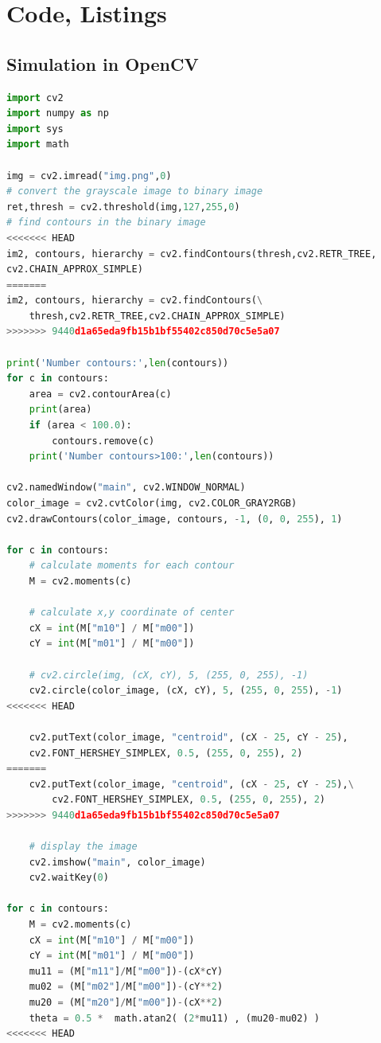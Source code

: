 \documentclass[a4paper]{report}
\begin{document}
\section{Code, Listings}

\subsection{Simulation in OpenCV}

\begin{lstlisting}[language=Python, caption=Simulation in OpenCV]      
import cv2
import numpy as np 
import sys
import math

img = cv2.imread("img.png",0)
# convert the grayscale image to binary image
ret,thresh = cv2.threshold(img,127,255,0)
# find contours in the binary image
<<<<<<< HEAD
im2, contours, hierarchy = cv2.findContours(thresh,cv2.RETR_TREE,
cv2.CHAIN_APPROX_SIMPLE)
=======
im2, contours, hierarchy = cv2.findContours(\
	thresh,cv2.RETR_TREE,cv2.CHAIN_APPROX_SIMPLE)
>>>>>>> 9440d1a65eda9fb15b1bf55402c850d70c5e5a07

print('Number contours:',len(contours))
for c in contours:
    area = cv2.contourArea(c)
    print(area)
	if (area < 100.0):
		contours.remove(c)
	print('Number contours>100:',len(contours))

cv2.namedWindow("main", cv2.WINDOW_NORMAL)
color_image = cv2.cvtColor(img, cv2.COLOR_GRAY2RGB)
cv2.drawContours(color_image, contours, -1, (0, 0, 255), 1) 

for c in contours:
    # calculate moments for each contour
    M = cv2.moments(c)

    # calculate x,y coordinate of center
    cX = int(M["m10"] / M["m00"])
    cY = int(M["m01"] / M["m00"])
   
    # cv2.circle(img, (cX, cY), 5, (255, 0, 255), -1)
    cv2.circle(color_image, (cX, cY), 5, (255, 0, 255), -1)
<<<<<<< HEAD
    
    cv2.putText(color_image, "centroid", (cX - 25, cY - 25),
    cv2.FONT_HERSHEY_SIMPLEX, 0.5, (255, 0, 255), 2)
=======
    cv2.putText(color_image, "centroid", (cX - 25, cY - 25),\
    	cv2.FONT_HERSHEY_SIMPLEX, 0.5, (255, 0, 255), 2)
>>>>>>> 9440d1a65eda9fb15b1bf55402c850d70c5e5a07

    # display the image
    cv2.imshow("main", color_image)
    cv2.waitKey(0)
    
for c in contours:
    M = cv2.moments(c)
    cX = int(M["m10"] / M["m00"])
    cY = int(M["m01"] / M["m00"])
    mu11 = (M["m11"]/M["m00"])-(cX*cY)
    mu02 = (M["m02"]/M["m00"])-(cY**2)
    mu20 = (M["m20"]/M["m00"])-(cX**2)
    theta = 0.5 *  math.atan2( (2*mu11) , (mu20-mu02) )
<<<<<<< HEAD
   

\end{lstlisting}
\end{document}
